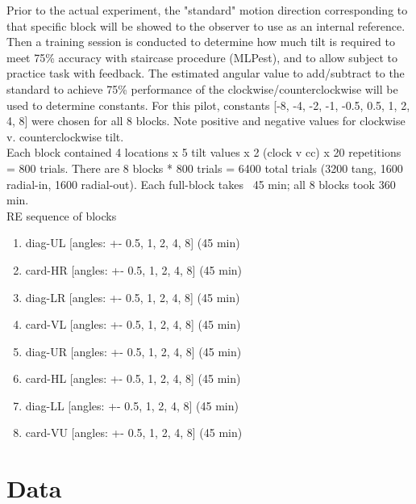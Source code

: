 \documentclass[11pt]{article} %
\begin{document}
Prior to the actual experiment, the "standard" motion direction corresponding to that specific block will be showed to the observer to use as an internal reference. Then a training session is conducted to determine how much tilt is required to meet 75\% accuracy with staircase procedure (MLPest), and to allow subject to practice task with feedback. The estimated angular value to add/subtract to the standard to achieve 75\% performance of the clockwise/counterclockwise will be used to determine constants. For this pilot, constants [-8, -4, -2, -1, -0.5, 0.5, 1, 2, 4, 8] were chosen for all 8 blocks. Note positive and negative values for clockwise v. counterclockwise tilt.
\\
Each block contained 4 locations x 5 tilt values x 2 (clock v cc) x 20 repetitions = 800 trials. There are 8 blocks * 800 trials = 6400 total trials (3200 tang, 1600 radial-in, 1600 radial-out). Each full-block takes ~45 min; all 8 blocks took 360 min. 
\\
RE sequence of blocks 
\begin{enumerate}
\item diag-UL [angles: +- 0.5, 1, 2, 4, 8] (45 min)
\item card-HR [angles: +- 0.5, 1, 2, 4, 8] (45 min)
\item diag-LR [angles: +- 0.5, 1, 2, 4, 8] (45 min)
\item card-VL [angles: +- 0.5, 1, 2, 4, 8] (45 min)
\item diag-UR [angles: +- 0.5, 1, 2, 4, 8] (45 min)
\item card-HL [angles: +- 0.5, 1, 2, 4, 8] (45 min)
\item diag-LL [angles: +- 0.5, 1, 2, 4, 8] (45 min)
\item card-VU [angles: +- 0.5, 1, 2, 4, 8] (45 min)
\end{enumerate}

\newpage
\section{Data}
\end{document}
